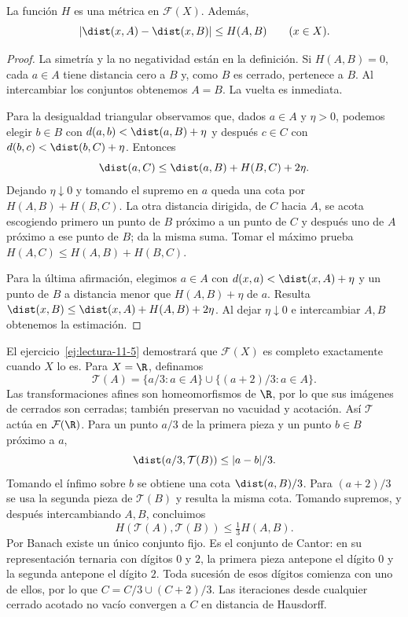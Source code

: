 \begin{proposicion}\label{ch11:hausdorff-metrica}
La función $H$ es una métrica en $\mathcal F(X)$. Además,
\[
 |\dist(x,A)-\dist(x,B)|\leq H(A,B)\qquad(x\in X).
\]
\end{proposicion}
\begin{proof}
La simetría y la no negatividad están en la definición. Si $H(A,B)=0$, cada $a\in A$ tiene distancia cero a $B$ y, como $B$ es cerrado, pertenece a $B$. Al intercambiar los conjuntos obtenemos $A=B$. La vuelta es inmediata.

Para la desigualdad triangular observamos que, dados $a\in A$ y $\eta>0$, podemos elegir $b\in B$ con $d(a,b)<\dist(a,B)+\eta$ y después $c\in C$ con $d(b,c)<\dist(b,C)+\eta$. Entonces
\[
 \dist(a,C)\leq\dist(a,B)+H(B,C)+2\eta.
\]
Dejando $\eta\downarrow0$ y tomando el supremo en $a$ queda una cota por $H(A,B)+H(B,C)$. La otra distancia dirigida, de $C$ hacia $A$, se acota escogiendo primero un punto de $B$ próximo a un punto de $C$ y después uno de $A$ próximo a ese punto de $B$; da la misma suma. Tomar el máximo prueba $H(A,C)\leq H(A,B)+H(B,C)$.

Para la última afirmación, elegimos $a\in A$ con $d(x,a)<\dist(x,A)+\eta$ y un punto de $B$ a distancia menor que $H(A,B)+\eta$ de $a$. Resulta $\dist(x,B)\leq\dist(x,A)+H(A,B)+2\eta$. Al dejar $\eta\downarrow0$ e intercambiar $A,B$ obtenemos la estimación.
\end{proof}

El ejercicio~\ref{ej:lectura-11-5} demostrará que $\mathcal F(X)$ es completo exactamente cuando $X$ lo es. Para $X=\R$, definamos
\[
 \mathcal T(A)=\{a/3:a\in A\}\cup\{(a+2)/3:a\in A\}.
\]
Las transformaciones afines son homeomorfismos de $\R$, por lo que sus imágenes de cerrados son cerradas; también preservan no vacuidad y acotación. Así $\mathcal T$ actúa en $\mathcal F(\R)$. Para un punto $a/3$ de la primera pieza y un punto $b\in B$ próximo a $a$,
\[
 \dist(a/3,\mathcal T(B))\leq|a-b|/3.
\]
Tomando el ínfimo sobre $b$ se obtiene una cota $\dist(a,B)/3$. Para $(a+2)/3$ se usa la segunda pieza de $\mathcal T(B)$ y resulta la misma cota. Tomando supremos, y después intercambiando $A,B$, concluimos
\[
 H(\mathcal T(A),\mathcal T(B))\leq\tfrac13H(A,B).
\]
Por Banach existe un único conjunto fijo. Es el conjunto de Cantor: en su representación ternaria con dígitos $0$ y $2$, la primera pieza antepone el dígito $0$ y la segunda antepone el dígito $2$. Toda sucesión de esos dígitos comienza con uno de ellos, por lo que $C=C/3\cup(C+2)/3$. Las iteraciones desde cualquier cerrado acotado no vacío convergen a $C$ en distancia de Hausdorff.

